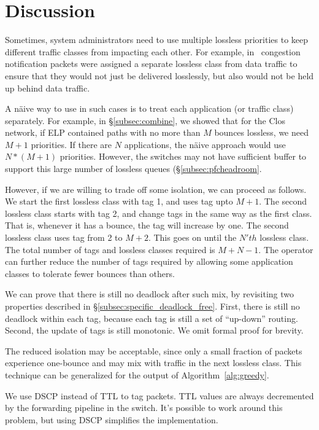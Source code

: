 \section{Discussion}

 Sometimes, system administrators need to
use multiple lossless priorities to keep different traffic classes from impacting each
other. For example, in~\cite{dcqcn} congestion notification packets were
assigned a separate lossless class from data traffic to ensure that they would
not just be delivered losslessly, but also would not be held up behind data
traffic.

A n{\"a}ive way to use \sysname{} in such cases is to treat each application (or
traffic class) separately.  For example, in \S\ref{subsec:combine}, we showed
that for the Clos network, if ELP contained paths with no more than $M$
bounces lossless, we need $M+1$ priorities. If there are $N$ applications, the
n{\"a}ive approach would use $N*(M+1)$ priorities.  However, the switches may
not have sufficient buffer to support this large number of lossless queues
(\S\ref{subsec:pfcheadroom}.

However, if we are willing to trade off some isolation, we can proceed as
follows.  We start the first lossless class with tag 1, and uses tag upto $M+1$.
The second lossless class starts with tag 2, and change tags in the same way as
the first class.  That is, whenever it has a bounce, the tag will increase by
one. The second lossless class uses tag from 2 to $M+2$. This goes on until the
$N'th$ lossless class. The total number of tags and lossless classes required is
$M + N -1$. The operator can further reduce the number of tags required by allowing
some application classes to tolerate fewer bounces than others.

We can prove that there is still no deadlock after such mix, by revisiting two
properties described in \S\ref{subsec:specific_deadlock_free}. First, there is
still no deadlock within each tag, because each tag is still a set of
``up-down'' routing. Second, the update of tags is still monotonic. We omit
formal proof for brevity.

The reduced isolation may be acceptable, since only a small fraction of
packets experience one-bounce and may mix with traffic in the next lossless
class.  This technique can be generalized for the output of
Algorithm~\ref{alg:greedy}.

 We use DSCP instead of TTL to tag packets. TTL
values are always decremented by the forwarding pipeline in the switch. It's
possible to work around this problem, but using DSCP simplifies the
implementation.

